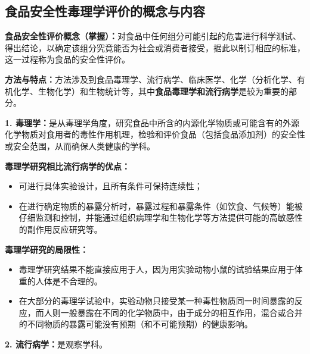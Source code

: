 \subsection{食品安全性毒理学评价的概念与内容}

\begin{keybox}
\textbf{食品安全性评价概念（掌握）：}对食品中任何组分可能引起的危害进行科学测试、得出结论，以确定该组分究竟能否为社会或消费者接受，据此以制订相应的标准，这一过程称为食品的安全性评价。

\textbf{方法与特点：}方法涉及到食品毒理学、流行病学、临床医学、化学（分析化学、有机化学、生物化学）和生物统计等，其中\textbf{食品毒理学和流行病学}是较为重要的部分。

\textbf{1. 毒理学：}是从毒理学角度，研究食品中所含的内源化学物质或可能含有的外源化学物质对食用者的毒性作用机理，检验和评价食品（包括食品添加剂）的安全性或安全范围，从而确保人类健康的学科。

\textbf{毒理学研究相比流行病学的优点：}
\begin{itemize}[leftmargin=*]
    \item 可进行具体实验设计，且所有条件可保持连续性；
    \item 在进行确定物质的暴露分析时，暴露过程和暴露条件（如饮食、气候等）能被仔细监测和控制，并能通过组织病理学和生物化学等方法提供可能的高敏感性的副作用反应研究等。
\end{itemize}

\textbf{毒理学研究的局限性：}
\begin{itemize}[leftmargin=*]
    \item 毒理学研究结果不能直接应用于人，因为用实验动物小鼠的试验结果应用于体重的人体是不合理的。
    \item 在大部分的毒理学试验中，实验动物只接受某一种毒性物质同一时间暴露的反应，而人则一般暴露在不同的化学物质中，由于成分的相互作用，混合或合并的不同物质的暴露可能没有预期（和不可能预期）的健康影响。
\end{itemize}

\textbf{2. 流行病学：}是观察学科。
\end{keybox}

